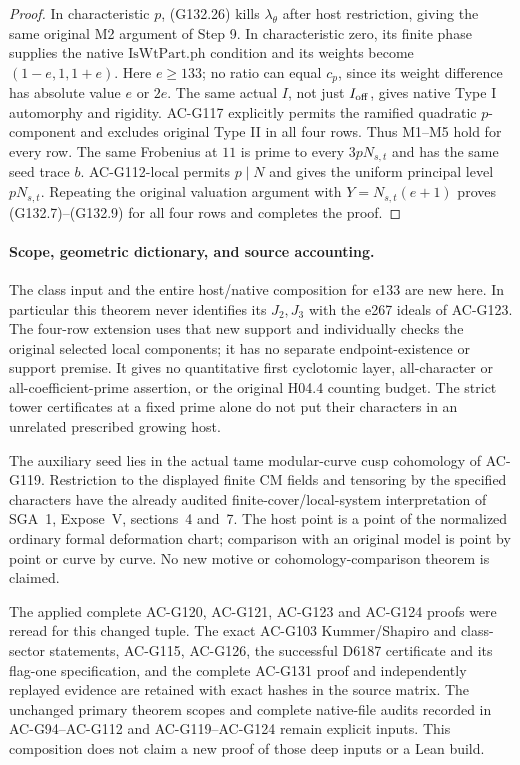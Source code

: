 \begin{proof}
In characteristic \(p\), (G132.26) kills
\(\lambda_\theta\) after host restriction, giving
the same original M2 argument of Step 9.
In characteristic zero, its finite phase supplies
the native \(\mathrm{IsWtPart.ph}\) condition and
its weights become \((1-e,1,1+e)\).
Here \(e\ge133\); no ratio can equal \(c_p\), since
its weight difference has absolute value \(e\)
or \(2e\).  The same actual \(I\), not just
\(I_{\rm off}\), gives native Type I automorphy
and rigidity.  AC-G117 explicitly permits the
ramified quadratic \(p\)-component and excludes
original Type II in all four rows.
Thus M1--M5 hold for every row.
The same Frobenius at \(11\) is prime to every
\(3pN_{s,t}\) and has the same seed trace \(b\).
AC-G112-local permits \(p\mid N\) and gives
the uniform principal level \(pN_{s,t}\).
Repeating the original valuation argument with
\(Y=N_{s,t}(e+1)\) proves (G132.7)--(G132.9)
for all four rows and completes the proof.
\end{proof}

\paragraph{Scope, geometric dictionary, and source accounting.}
The class input and the entire host/native composition for e133
are new here.  In particular this theorem never identifies its
\(J_2,J_3\) with the e267 ideals of AC-G123.
The four-row extension uses that new support and individually
checks the original selected local components; it has no separate
endpoint-existence or support premise.
It gives no quantitative first cyclotomic layer, all-character
or all-coefficient-prime assertion, or the original H04.4 counting
budget.  The strict tower certificates at a fixed prime alone do
not put their characters in an unrelated prescribed growing host.

The auxiliary seed lies in the actual tame modular-curve cusp
cohomology of AC-G119.  Restriction to the displayed finite CM
fields and tensoring by the specified characters have the already
audited finite-cover/local-system interpretation of SGA~1,
Expose~V, sections~4 and~7.  The host point is a point of the
normalized ordinary formal deformation chart; comparison with
an original model is point by point or curve by curve.
No new motive or cohomology-comparison theorem is claimed.

The applied complete AC-G120, AC-G121, AC-G123 and AC-G124 proofs
were reread for this changed tuple.  The exact AC-G103
Kummer/Shapiro and class-sector statements, AC-G115, AC-G126,
the successful D6187 certificate and its flag-one specification,
and the complete AC-G131 proof and independently replayed
evidence are retained with exact hashes in the source matrix.
The unchanged primary theorem scopes and complete native-file
audits recorded in AC-G94--AC-G112 and AC-G119--AC-G124 remain
explicit inputs.  This composition does not claim a new proof
of those deep inputs or a Lean build.
